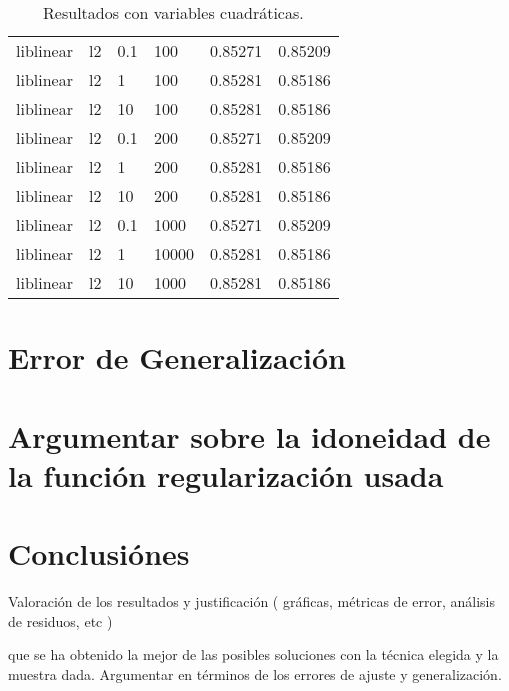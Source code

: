 \documentclass[11pt,a4paper]{article}
\begin{document}
\begin{table}[h]
\begin{center}
\begin{tabular}{|l|l|l|l|l|l|}
liblinear & l2 & 0.1 & 100 & 0.85271 & 0.85209\\

liblinear & l2 & 1  &100  & 0.85281 & 0.85186\\

liblinear & l2 & 10 & 100 & 0.85281 & 0.85186\\

liblinear & l2 & 0.1 & 200 & 0.85271 & 0.85209\\

liblinear & l2 & 1 & 200 & 0.85281 & 0.85186\\

liblinear & l2 & 10  &200  & 0.85281 & 0.85186\\

liblinear & l2 & 0.1 & 1000 & 0.85271 & 0.85209\\

liblinear & l2 & 1 & 10000  & 0.85281 & 0.85186\\

liblinear & l2 & 10 & 1000 & 0.85281 & 0.85186\\ \hline

\end{tabular}
\end{center}
\caption{Resultados con variables cuadráticas.}
	\end{table}

\newpage
\section{ Error de Generalización}
\section{ Argumentar sobre la idoneidad de la función regularización usada }
\section{ Conclusiónes }
Valoración de los resultados y justificación
( gráficas, métricas de error, análisis de residuos, etc )


que se ha obtenido la mejor de las posibles soluciones con la técnica elegida y la muestra dada. Argumentar en términos de los errores de ajuste y generalización. 
\end{document}
